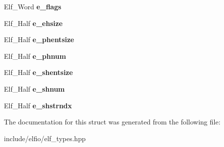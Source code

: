 \begin{DoxyCompactItemize}
\item 
Elf\+\_\+\+Word {\bfseries e\+\_\+flags}\hypertarget{struct_e_l_f_i_o_1_1_elf64___ehdr_a8976c6f90d7c19888dc4c60a0f84e7f5}{}\label{struct_e_l_f_i_o_1_1_elf64___ehdr_a8976c6f90d7c19888dc4c60a0f84e7f5}

\item 
Elf\+\_\+\+Half {\bfseries e\+\_\+ehsize}\hypertarget{struct_e_l_f_i_o_1_1_elf64___ehdr_a78871cca52febaacdf30f8f333b41e68}{}\label{struct_e_l_f_i_o_1_1_elf64___ehdr_a78871cca52febaacdf30f8f333b41e68}

\item 
Elf\+\_\+\+Half {\bfseries e\+\_\+phentsize}\hypertarget{struct_e_l_f_i_o_1_1_elf64___ehdr_abb0d4f4ed6e46add571b647f1ba3138f}{}\label{struct_e_l_f_i_o_1_1_elf64___ehdr_abb0d4f4ed6e46add571b647f1ba3138f}

\item 
Elf\+\_\+\+Half {\bfseries e\+\_\+phnum}\hypertarget{struct_e_l_f_i_o_1_1_elf64___ehdr_a8df1c15d6adf972eee8325e507bb725a}{}\label{struct_e_l_f_i_o_1_1_elf64___ehdr_a8df1c15d6adf972eee8325e507bb725a}

\item 
Elf\+\_\+\+Half {\bfseries e\+\_\+shentsize}\hypertarget{struct_e_l_f_i_o_1_1_elf64___ehdr_acb1b4a8527d971c19a75116b1a9d79ac}{}\label{struct_e_l_f_i_o_1_1_elf64___ehdr_acb1b4a8527d971c19a75116b1a9d79ac}

\item 
Elf\+\_\+\+Half {\bfseries e\+\_\+shnum}\hypertarget{struct_e_l_f_i_o_1_1_elf64___ehdr_ace95dd5d73bedcf493c4097fd8ff72ea}{}\label{struct_e_l_f_i_o_1_1_elf64___ehdr_ace95dd5d73bedcf493c4097fd8ff72ea}

\item 
Elf\+\_\+\+Half {\bfseries e\+\_\+shstrndx}\hypertarget{struct_e_l_f_i_o_1_1_elf64___ehdr_a1d4eb603678e17c1e9604aafcb6cda74}{}\label{struct_e_l_f_i_o_1_1_elf64___ehdr_a1d4eb603678e17c1e9604aafcb6cda74}

\end{DoxyCompactItemize}


The documentation for this struct was generated from the following file\+:\begin{DoxyCompactItemize}
\item 
include/elfio/elf\+\_\+types.\+hpp\end{DoxyCompactItemize}
